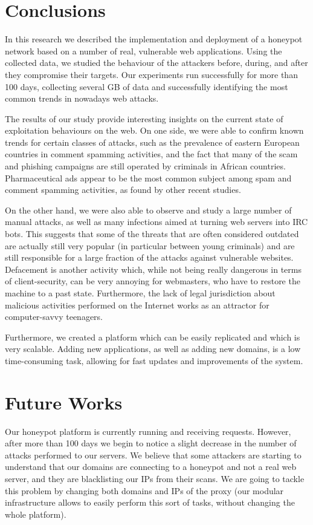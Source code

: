 \section{Conclusions}

In this research we described the implementation and deployment of a honeypot network based on a number of real, vulnerable web applications. Using the collected data, we studied the behaviour of the attackers before, during, and after they compromise their targets. Our experiments run successfully for more than 100 days, collecting several GB of data and successfully identifying the most common trends in nowadays web attacks.

The results of our study provide interesting insights on the current state of exploitation behaviours on the web. On one side, we were able to confirm known trends for certain classes of attacks, such as the prevalence of eastern European countries in comment spamming activities, and the fact that many of the scam and phishing campaigns are still operated by criminals in African countries. Pharmaceutical ads appear to be the most common subject among spam and comment spamming activities, as found by other recent studies.

On the other hand, we were also able to observe and study a large number of manual attacks, as well as many infections aimed at turning web servers into IRC bots. This suggests that some of the threats that are often considered outdated are actually still very popular (in particular between young criminals) and are still responsible for a large fraction of the attacks against vulnerable websites. Defacement is another activity which, while not being really dangerous in terms of client-security, can be very annoying for webmasters, who have to restore the machine to a past state. Furthermore, the lack of legal jurisdiction about malicious activities performed on the Internet works as an attractor for computer-savvy teenagers.

Furthermore, we created a platform which can be easily replicated and which is very scalable. Adding new applications, as well as adding new domains, is a low time-consuming task, allowing for fast updates and improvements of the system.

\section{Future Works}

Our honeypot platform is currently running and receiving requests. However, after more than 100 days we begin to notice a slight decrease in the number of attacks performed to our servers. We believe that some attackers are starting to understand that our domains are connecting to a honeypot and not a real web server, and they are blacklisting our IPs from their scans. We are going to tackle this problem by changing both domains and IPs of the proxy (our modular infrastructure allows to easily perform this sort of tasks, without changing the whole platform).

